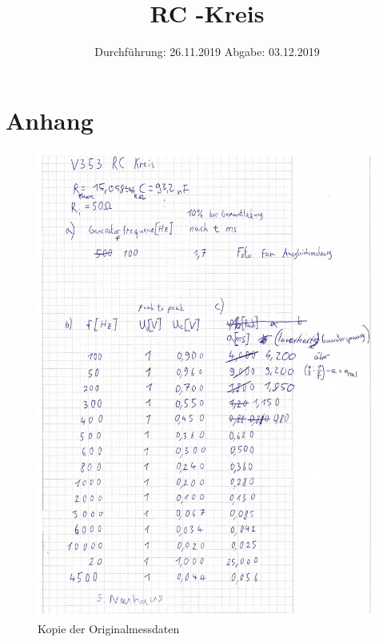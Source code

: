 

\subject{V353}
\title{RC -Kreis}
\date{%
  Durchführung: 26.11.2019
  \hspace{3em}
  Abgabe: 03.12.2019
}



\maketitle
\thispagestyle{empty}
\tableofcontents
\newpage







\printbibliography{}

\section{Anhang}
\begin{figure}
  \centering
  \includegraphics[width=\textwidth]{images/originaldaten.jpg}
  \caption{Kopie der Originalmessdaten}
  \label{fig:originaldaten_1}
\end{figure}


